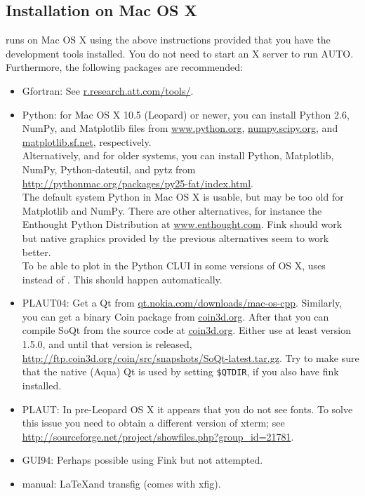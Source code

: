 \documentclass[12pt]{report}
\begin{document}
\subsection{Installation on Mac OS X}
\AUTO runs on Mac OS X using the above instructions provided that
you have the development tools
installed. You do not need to start an X server to run AUTO.
Furthermore, the following packages are recommended:
\begin{itemize}
\item Gfortran: See \url{r.research.att.com/tools/}.
\item Python: for Mac OS X 10.5 (Leopard) or newer, 
you can install Python 2.6, NumPy, and Matplotlib  files
from \url{www.python.org}, \url{numpy.scipy.org},
and \url{matplotlib.sf.net}, respectively.\\
Alternatively, and for older systems, you can install Python,
Matplotlib, NumPy, Python-dateutil, and pytz from 
\url{http://pythonmac.org/packages/py25-fat/index.html}.\\
The default system Python in Mac OS X is usable, but may be too old for
Matplotlib and NumPy.
There are other alternatives, for instance the Enthought Python
Distribution at \url{www.enthought.com}. Fink should work but native
graphics provided by the previous alternatives seem to work better.\\
To be able to plot in the Python CLUI in some versions of OS X,
\AUTO uses  instead of .
This should happen automatically.
\item {\cal PLAUT04}: Get a Qt  from
\url{qt.nokia.com/downloads/mac-os-cpp}.
Similarly, you can get a binary Coin package from \url{coin3d.org}.
After that you can compile SoQt from the source code
at \url{coin3d.org}. Either use at least version 1.5.0, and until that version
is released, \url{http://ftp.coin3d.org/coin/src/snapshots/SoQt-latest.tar.gz}.
Try to make sure that the native (Aqua) Qt
is used by setting {\tt \$QTDIR}, if you also have fink installed.
\item {\cal PLAUT}: In pre-Leopard OS X it appears that you do not see
fonts. To solve this issue you need to obtain a different
version of xterm; see
\url{http://sourceforge.net/project/showfiles.php?group_id=21781}.
\item GUI94: Perhaps possible using Fink but not attempted.
\item manual: \LaTeX and transfig (comes with xfig).
\end{itemize}
\end{document}
